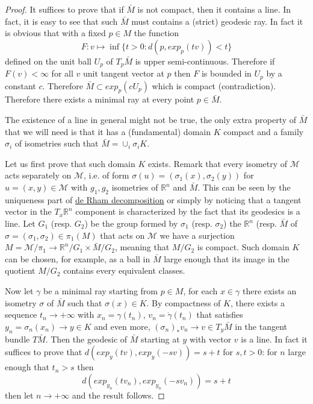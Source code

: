 \documentclass[11pt]{article}
\begin{document}
\begin{proof}
It suffices to prove that if \(\bar M\) is not compact, then it contains a line. In fact, it is easy
to see that such \(\bar M\) must contains a (strict) geodesic ray. In fact it is obvious that with a fixed \(p\in
M\) the function
\[
F: v\mapsto \inf \{t>0: d(p,exp_p(tv)) < t\}
\]
defined on the unit ball \(U_p\) of \(T_p\bar M\) is upper semi-continuous. Therefore if \(F(v)<\infty\)
for all \(v\) unit tangent vector at \(p\) then \(F\) is bounded in \(U_p\) by a constant \(c\). Therefore
\(\bar M\subset exp_p(cU_p)\) which is compact (contradiction). Therefore there exists a minimal ray
at every point \(p\in \bar M\).

The existence of a line in general might not be true, the only extra property of \(\bar M\) that we
will need is that it has a (fundamental) domain \(K\) compact and a family \(\sigma_i\) of isometries
such that \(\bar M = \cup_i \sigma_i K\).

Let us first prove that such domain \(K\) exists. Remark that every isometry of \(\mathcal{M}\) acts
separately on \(\mathcal{M}\), i.e. of form \(\sigma(u) = (\sigma_1(x), \sigma_2(y))\) for \(u=(x,y)\in
\mathcal{M}\) with \(g_1, g_2\) isometries of \(\mathbb{R}^n\) and \(\bar M\). This can be seen by the
uniqueness part of \href{de-rham-decomposition.org}{de Rham decomposition} or simply by noticing that a tangent vector in the \(T_x\mathbb{R}^n\) component is characterized by the fact that its geodesics is a
line. Let \(G_1\) (resp. \(G_2\)) be the group formed by \(\sigma_1\) (resp. \(\sigma_2\)) the \(\mathbb{R}^n\)
(resp. \(\bar M\) of \(\sigma = (\sigma_1,\sigma_2)\in \pi_1(M)\) that acts on \(\mathcal{M}\) we have a
surjection \(M = \mathcal{M}/\pi_1 \longrightarrow \mathbb{R}^n/G_1\times \bar M/G_2\), meaning that
\(M/G_2\) is compact. Such domain \(K\) can be chosen, for example, as a ball in \(\bar M\) large enough that its
image in the quotient \(M/G_2\) contains every equivalent classes.

Now let \(\gamma\) be a minimal ray starting from \(p\in M\), for each \(x\in \gamma\) there exists an
isometry \(\sigma\) of \(\bar M\) such that \(\sigma(x)\in K\). By compactness of \(K\), there exists a
sequence \(t_n \to +\infty\) with \(x_n =\gamma(t_n)\), \(v_n = \dot\gamma(t_n)\) that satisfies \(y_n =
\sigma_n(x_n) \to y\in K\) and even more, \((\sigma_n)_* v_n \to v\in T_y\bar M\) in the tangent bundle \(T\bar
M\). Then the geodesic of \(\bar M\) starting at \(y\) with vector \(v\) is a
line. In fact it suffices to prove that \(d(exp_y(t v), exp_y(-s v)) = s+t\) for \(s,t>0\): for \(n\)
large enough that \(t_n > s\) then
\[
d(exp_{y_n}(tv_n), exp_{y_n}(-sv_n)) = s+t
\]
then let \(n\to +\infty\) and the result follows.
\end{proof}
\end{document}
